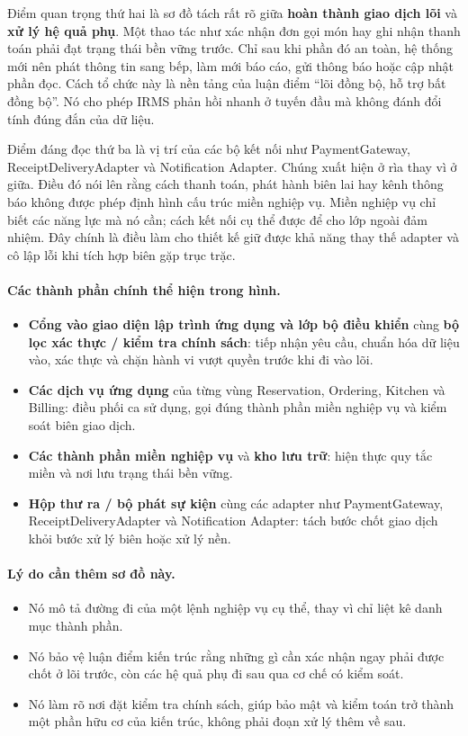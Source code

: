 \documentclass[11pt,a4paper]{article}
\begin{document}
Điểm quan trọng thứ hai là sơ đồ tách rất rõ giữa \textbf{hoàn thành giao dịch lõi} và \textbf{xử lý hệ quả phụ}. Một thao tác như xác nhận đơn gọi món hay ghi nhận thanh toán phải đạt trạng thái bền vững trước. Chỉ sau khi phần đó an toàn, hệ thống mới nên phát thông tin sang bếp, làm mới báo cáo, gửi thông báo hoặc cập nhật phần đọc. Cách tổ chức này là nền tảng của luận điểm \enquote{lõi đồng bộ, hỗ trợ bất đồng bộ}. Nó cho phép IRMS phản hồi nhanh ở tuyến đầu mà không đánh đổi tính đúng đắn của dữ liệu.

Điểm đáng đọc thứ ba là vị trí của các bộ kết nối như \textsf{PaymentGateway}, \textsf{ReceiptDeliveryAdapter} và \textsf{Notification Adapter}. Chúng xuất hiện ở rìa thay vì ở giữa. Điều đó nói lên rằng cách thanh toán, phát hành biên lai hay kênh thông báo không được phép định hình cấu trúc miền nghiệp vụ. Miền nghiệp vụ chỉ biết các năng lực mà nó cần; cách kết nối cụ thể được để cho lớp ngoài đảm nhiệm. Đây chính là điều làm cho thiết kế giữ được khả năng thay thế adapter và cô lập lỗi khi tích hợp biên gặp trục trặc.

\paragraph{Các thành phần chính thể hiện trong hình.}
\begin{itemize}
  \item \textbf{Cổng vào giao diện lập trình ứng dụng và lớp bộ điều khiển} cùng \textbf{bộ lọc xác thực / kiểm tra chính sách}: tiếp nhận yêu cầu, chuẩn hóa dữ liệu vào, xác thực và chặn hành vi vượt quyền trước khi đi vào lõi.
  \item \textbf{Các dịch vụ ứng dụng} của từng vùng \textsf{Reservation}, \textsf{Ordering}, \textsf{Kitchen} và \textsf{Billing}: điều phối ca sử dụng, gọi đúng thành phần miền nghiệp vụ và kiểm soát biên giao dịch.
  \item \textbf{Các thành phần miền nghiệp vụ} và \textbf{kho lưu trữ}: hiện thực quy tắc miền và nơi lưu trạng thái bền vững.
  \item \textbf{Hộp thư ra / bộ phát sự kiện} cùng các adapter như \textsf{PaymentGateway}, \textsf{ReceiptDeliveryAdapter} và \textsf{Notification Adapter}: tách bước chốt giao dịch khỏi bước xử lý biên hoặc xử lý nền.
\end{itemize}

\paragraph{Lý do cần thêm sơ đồ này.}
\begin{itemize}
  \item Nó mô tả đường đi của một lệnh nghiệp vụ cụ thể, thay vì chỉ liệt kê danh mục thành phần.
  \item Nó bảo vệ luận điểm kiến trúc rằng những gì cần xác nhận ngay phải được chốt ở lõi trước, còn các hệ quả phụ đi sau qua cơ chế có kiểm soát.
  \item Nó làm rõ nơi đặt kiểm tra chính sách, giúp bảo mật và kiểm toán trở thành một phần hữu cơ của kiến trúc, không phải đoạn xử lý thêm về sau.
\end{itemize}
\end{document}
